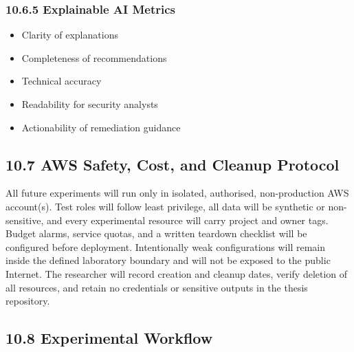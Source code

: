 \subsubsection{10.6.5 Explainable AI Metrics}

\begin{itemize}
\tightlist
\item
  Clarity of explanations\\
\item
  Completeness of recommendations\\
\item
  Technical accuracy\\
\item
  Readability for security analysts\\
\item
  Actionability of remediation guidance
\end{itemize}

\subsection{10.7 AWS Safety, Cost, and Cleanup Protocol}

All future experiments will run only in isolated, authorised, non-production AWS account(s). Test roles will follow least privilege, all data will be synthetic or non-sensitive, and every experimental resource will carry project and owner tags. Budget alarms, service quotas, and a written teardown checklist will be configured before deployment. Intentionally weak configurations will remain inside the defined laboratory boundary and will not be exposed to the public Internet. The researcher will record creation and cleanup dates, verify deletion of all resources, and retain no credentials or sensitive outputs in the thesis repository.

\subsection{10.8 Experimental Workflow}

